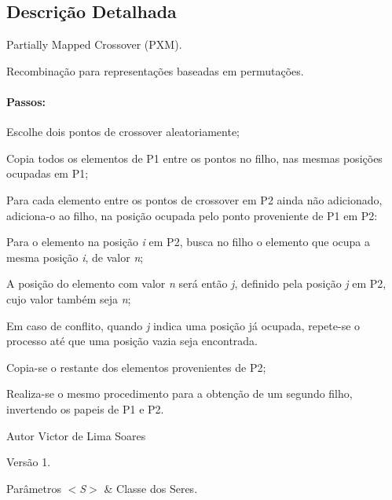 \subsection{Descrição Detalhada}
Partially Mapped Crossover (P\-X\-M). 

Recombinação para representações baseadas em permutações. 

\paragraph*{Passos\-:}


\begin{DoxyEnumerate}
\item Escolhe dois pontos de crossover aleatoriamente; 
\item Copia todos os elementos de P1 entre os pontos no filho, nas mesmas posições ocupadas em P1; 
\item Para cada elemento entre os pontos de crossover em P2 ainda não adicionado, adiciona-\/o ao filho, na posição ocupada pelo ponto proveniente de P1 em P2\-: 
\begin{DoxyItemize}
\item Para o elemento na posição {\itshape i} em P2, busca no filho o elemento que ocupa a mesma posição {\itshape i}, de valor {\itshape n};  
\item A posição do elemento com valor {\itshape n} será então {\itshape j}, definido pela posição {\itshape j} em P2, cujo valor também seja {\itshape n};  
\item Em caso de conflito, quando {\itshape j} indica uma posição já ocupada, repete-\/se o processo até que uma posição vazia seja encontrada.  
\end{DoxyItemize}
\item Copia-\/se o restante dos elementos provenientes de P2; 
\item Realiza-\/se o mesmo procedimento para a obtenção de um segundo filho, invertendo os papeis de P1 e P2. 
\end{DoxyEnumerate}

\begin{DoxyAuthor}{Autor}
Victor de Lima Soares 
\end{DoxyAuthor}
\begin{DoxyVersion}{Versão}
1.
\end{DoxyVersion}

\begin{DoxyParams}{Parâmetros}
{\em $<$\-S$>$} & Classe dos Seres. \\
\hline
\end{DoxyParams}



